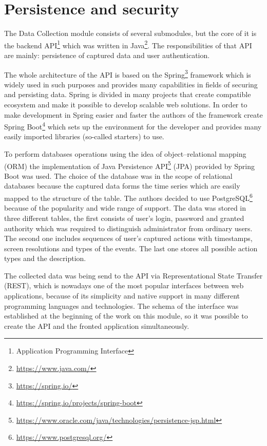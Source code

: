 \section{Persistence and security}\label{sec:persistence-and-security}
The Data Collection module consists of several submodules, but the core of it is the backend API\footnote{Application Programming Interface} which was written in Java\footnote{\url{https://www.java.com/}}.
The responsibilities of that API are mainly: persistence of captured data and user authentication.

The whole architecture of the API is based on the Spring\footnote{\url{https://spring.io/}} framework which is widely used in such purposes and provides many capabilities in fields of securing and persisting data.
Spring is divided in many projects that create compatible ecosystem and make it possible to develop scalable web solutions.
In order to make development in Spring easier and faster the authors of the framework create Spring Boot\footnote{\url{https://spring.io/projects/spring-boot}} which sets up the environment for the developer and provides many easily imported libraries (so-called starters) to use.

To perform databases operations using the idea of object–relational mapping (ORM) the implementation of Java Persistence API\footnote{\url{https://www.oracle.com/java/technologies/persistence-jsp.html}} (JPA) provided by Spring Boot was used.
The choice of the database was in the scope of relational databases because the captured data forms the time series which are easily mapped to the structure of the table.
The authors decided to use PostgreSQL\footnote{\url{https://www.postgresql.org/}} because of the popularity and wide range of support.
The data was stored in three different tables, the first consists of user's login, password and granted authority which was required to distinguish administrator from ordinary users.
The second one includes sequences of user's captured actions with timestamps, screen resolutions and types of the events.
The last one stores all possible action types and the description.

The collected data was being send to the API via Representational State Transfer (REST), which is nowadays one of the most popular interfaces between web applications, because of its simplicity and native support in many different programming languages and technologies.
The schema of the interface was established at the beginning of the work on this module, so it was possible to create the API and the fronted application simultaneously.

